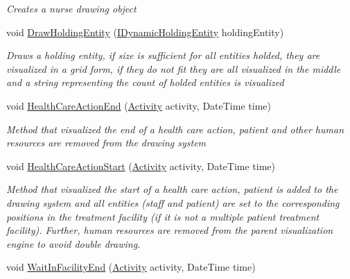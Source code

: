 \begin{DoxyCompactItemize}
\begin{DoxyCompactList}\small\item\em Creates a nurse drawing object \end{DoxyCompactList}\item 
void \hyperlink{class_sample_hospital_model_1_1_visualization_1_1_w_p_f_visualization_health_care_organizational_unit_a336526e393cafeb2fa858dc7a5af4424}{Draw\+Holding\+Entity} (\hyperlink{interface_simulation_core_1_1_h_c_c_m_elements_1_1_i_dynamic_holding_entity}{I\+Dynamic\+Holding\+Entity} holding\+Entity)
\begin{DoxyCompactList}\small\item\em Draws a holding entity, if size is sufficient for all entities holded, they are visualized in a grid form, if they do not fit they are all visualized in the middle and a string representing the count of holded entities is visualized \end{DoxyCompactList}\item 
void \hyperlink{class_sample_hospital_model_1_1_visualization_1_1_w_p_f_visualization_health_care_organizational_unit_a381be212ee8b14402af4dfdad0a13b3c}{Health\+Care\+Action\+End} (\hyperlink{class_simulation_core_1_1_h_c_c_m_elements_1_1_activity}{Activity} activity, Date\+Time time)
\begin{DoxyCompactList}\small\item\em Method that visualized the end of a health care action, patient and other human resources are removed from the drawing system \end{DoxyCompactList}\item 
void \hyperlink{class_sample_hospital_model_1_1_visualization_1_1_w_p_f_visualization_health_care_organizational_unit_a2850fb541052f3bea942704cff08dc78}{Health\+Care\+Action\+Start} (\hyperlink{class_simulation_core_1_1_h_c_c_m_elements_1_1_activity}{Activity} activity, Date\+Time time)
\begin{DoxyCompactList}\small\item\em Method that visualized the start of a health care action, patient is added to the drawing system and all entities (staff and patient) are set to the corresponding positions in the treatment facility (if it is not a multiple patient treatment facility). Further, human resources are removed from the parent visualization engine to avoid double drawing. \end{DoxyCompactList}\item 
void \hyperlink{class_sample_hospital_model_1_1_visualization_1_1_w_p_f_visualization_health_care_organizational_unit_aae878e4037c873bb81ffcc8618f789f9}{Wait\+In\+Facility\+End} (\hyperlink{class_simulation_core_1_1_h_c_c_m_elements_1_1_activity}{Activity} activity, Date\+Time time)

\end{DoxyCompactItemize}

